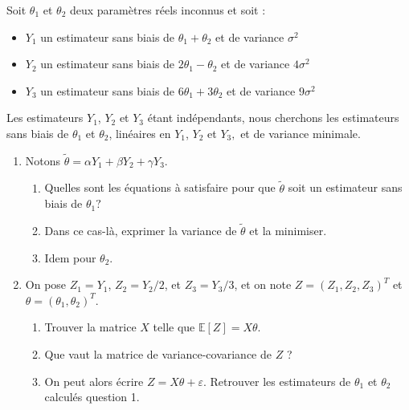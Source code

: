 \documentclass{../headers/td_upc}
\providecommand{\1}{\mathds{1}}
\begin{document}
	  Soit $\theta_{1}$ et $\theta_{2}$ deux paramètres réels inconnus et soit :
	\begin{itemize}
			\item $Y_{1}$ un estimateur sans biais de $\theta_{1} + \theta_{2}$ et de variance $\sigma^{2}$
			\item $Y_{2}$ un estimateur sans biais de $2 \theta_{1} - \theta_{2}$ et de variance $4 \sigma^{2}$ 
			\item $Y_{3}$ un estimateur sans biais de $6 \theta_{1} + 3 \theta_{2}$ et de variance $9 \sigma^{2}$ 	
	\end{itemize}
		Les estimateurs $Y_{1}$, $Y_{2}$ et $Y_{3}$ étant indépendants, nous cherchons les estimateurs sans biais de $\theta_{1}$ et $\theta_{2}$, linéaires en $Y_{1}$, $Y_{2}$ et $Y_{3},$ et de variance minimale.
	\begin{enumerate}
		\item Notons $\tilde{\theta} = \alpha Y_{1} + \beta Y_{2} + \gamma Y_{3}$.
		\begin{enumerate}
			\item Quelles sont les équations à satisfaire pour que $\tilde{\theta}$ soit un estimateur sans biais de $\theta_{1} ?$
			\item Dans ce cas-là, exprimer la variance de $\tilde{\theta}$ et la minimiser.
			\item Idem pour $\theta_{2}$.
		\end{enumerate}
		\item On pose $Z_{1} = Y_{1}$, $Z_{2} = Y_{2} / 2$, et $Z_{3} = Y_{3} / 3$, et on note $Z=\left(Z_{1}, Z_{2}, Z_{3}\right)^T$ et $\theta=\left(\theta_{1}, \theta_{2}\right)^T$.
		\begin{enumerate}
			\item Trouver la matrice $X$ telle que $\mathbb{E}[Z]=X \theta$.
			\item Que vaut la matrice de variance-covariance de $Z$ ?
			\item On peut alors écrire $Z=X \theta+\varepsilon$. Retrouver les estimateurs de $\theta_{1}$ et $\theta_{2}$ calculés question 1.
		\end{enumerate}
	\end{enumerate}
	
		\cor{\newpage}
\end{document}
